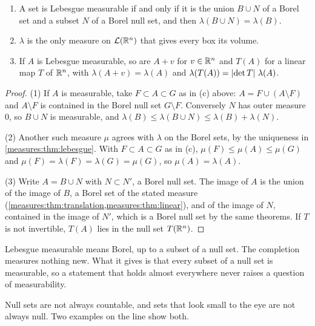 \begin{notechapter}
\begin{corollary}
\label{caratheodory:cor:completion}
\begin{enumerate}[nosep]
  \item A set is Lebesgue measurable if and only if it is the union
        $B\cup N$ of a Borel set and a subset $N$ of a Borel null set,
        and then $\lambda(B\cup N) = \lambda(B)$.
  \item $\lambda$ is the only measure on $\mathcal L(\mathbb{R}^n)$ that gives
        every box its volume.
  \item If $A$ is Lebesgue measurable, so are $A + v$ for
        $v\in\mathbb{R}^n$ and $T(A)$ for a linear map $T$ of $\mathbb{R}^n$, with
        $\lambda(A + v) = \lambda(A)$ and
        $\lambda(T(A)) = \left|\det T\right|\,\lambda(A)$.
\end{enumerate}
\end{corollary}

\begin{proof}
(1) If $A$ is measurable, take $F\subset A\subset G$ as in (c) above:
$A = F\cup(A\setminus F)$ and $A\setminus F$ is contained in the Borel
null set $G\setminus F$. Conversely $N$ has outer measure $0$, so
$B\cup N$ is measurable, and
$\lambda(B)\leq\lambda(B\cup N)\leq\lambda(B) + \lambda(N)$.

(2) Another such measure $\mu$ agrees with $\lambda$ on the Borel sets,
by the uniqueness in \cref{measures:thm:lebesgue}. With
$F\subset A\subset G$ as in (c),
$\mu(F)\leq\mu(A)\leq\mu(G)$ and
$\mu(F) = \lambda(F) = \lambda(G) = \mu(G)$, so
$\mu(A) = \lambda(A)$.

(3) Write $A = B\cup N$ with $N\subset N'$, a Borel null set. The image
of $A$ is the union of the image of $B$, a Borel set of the stated
measure (\cref{measures:thm:translation,measures:thm:linear}), and of
the image of $N$, contained in the image of $N'$, which is a Borel
null set by the same theorems. If $T$ is not invertible, $T(A)$ lies
in the null set $T(\mathbb{R}^n)$.
\end{proof}

\begin{keyidea}
Lebesgue measurable means Borel, up to a subset of a null set. The
completion measures nothing new. What it gives is that every subset of
a null set is measurable, so a statement that holds almost everywhere
never raises a question of measurability.
\end{keyidea}

Null sets are not always countable, and sets that look small to the
eye are not always null. Two examples on the line show both.


\end{notechapter}
